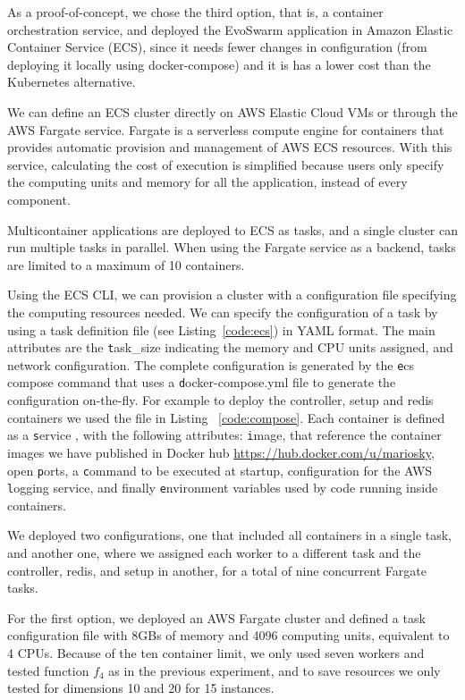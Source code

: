 \documentclass[review]{elsarticle}
\begin{document}
As a proof-of-concept, we chose the third option, that is, a container orchestration service, and deployed the EvoSwarm application in Amazon Elastic
Container Service (ECS),  since it needs fewer changes in configuration 
(from deploying it locally using docker-compose) and it is has a lower cost than the Kubernetes alternative. %

We can define an ECS cluster directly on AWS Elastic Cloud VMs or through the AWS Fargate service.
Fargate is a serverless compute engine for containers that provides automatic provision 
and management of AWS ECS resources. With this service, calculating the cost of execution
is simplified because users only specify the computing units and memory for all the application,
instead of every component. 

Multicontainer applications are deployed to ECS as tasks, and a single cluster can run multiple tasks in
parallel. When using the Fargate service as a backend, tasks are limited to a
maximum of 10 containers.  

Using the ECS CLI, we can provision a cluster with a configuration file
specifying the computing resources needed. We can specify the configuration of a task 
by using a task definition file (see Listing~\ref{code:ecs}) in YAML format.
The main attributes are the {\texttt task\_size} indicating the memory and CPU units
assigned, and network configuration. The complete configuration is generated
by the {\texttt ecs compose command} that uses a {\texttt docker-compose.yml} file to generate 
the configuration on-the-fly. For example to deploy the controller, setup and redis 
containers we used the file in Listing ~\ref{code:compose}.
Each container is defined as a  {\texttt service} , with the following attributes: {\texttt image},
that reference the container images we have published in Docker hub
\url{https://hub.docker.com/u/mariosky}, open {\texttt ports}, a {\texttt command} to be executed at
startup, configuration for the AWS {\texttt logging} service, and finally {\texttt environment}
variables used by code running inside containers.


We deployed two configurations, one that included all containers in a single task,
and another one, where we assigned each worker to a different task and the controller, 
redis, and setup in another, for a total of nine concurrent Fargate tasks. 

For the first option, we deployed an AWS Fargate cluster and defined a task configuration file with
8GBs of memory and 4096 computing units, equivalent to 4 CPUs. Because of the
ten container limit, we only used seven workers and tested function $f_4$ as
in the previous experiment, and to save resources we only tested for dimensions 10 and 20 for 15 instances.
\end{document}
